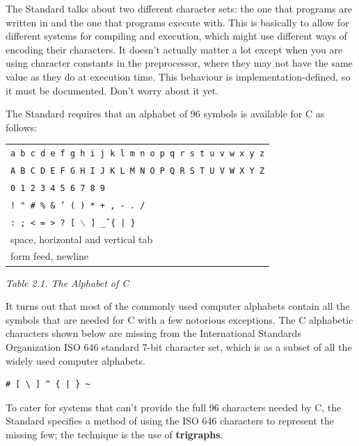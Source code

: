    The Standard talks about two different character sets: the one that
    programs are written in and the one that programs execute with. This is
    basically to allow for different systems for compiling and execution,
    which might use different ways of encoding their characters. It doesn't
    actually matter a lot except when you are using character constants in the
    preprocessor, where they may not have the same value as they do at
    execution time. This behaviour is implementation-defined, so it must be
    documented. Don't worry about it yet.


   The Standard requires that an alphabet of 96 symbols is available
    for C as follows:


   \begin{tabular}{p{\textwidth}}
     \texttt{a b c d e f g h i j k l m n o p q r s t u v w x y z}
    \\

     \texttt{A B C D E F G H I J K L M N O P Q R S T U V W X Y Z}
    \\

     \texttt{0 1 2 3 4 5 6 7 8 9}
    \\

     \texttt{! " \# \% \& ' ( ) * + , - . /}
    \\

     \texttt{: ; < = > ? [ $\backslash$ ] \^ \_ \{ | \} ~}
    \\

     space, horizontal and vertical tab
    \\

     form feed, newline
    \\
\end{tabular}

\begin{center}\textit{Table 2.1. The Alphabet of C}\end{center}


   It turns out that most of the commonly used computer alphabets contain
    all the symbols that are needed for C with a few notorious exceptions. The
    C alphabetic characters shown below are missing from the International
    Standards Organization ISO 646 standard 7-bit character set, which is
    as a subset of all the widely used computer alphabets.


   \begin{Verbatim}
# [ \ ] ^ { | } ~
\end{Verbatim}

   To cater for systems that can't provide the full 96 characters
    needed by C, the Standard specifies a method of using the
    ISO 646 characters to represent the missing few; the technique is the
    use of \textbf{trigraphs}.


